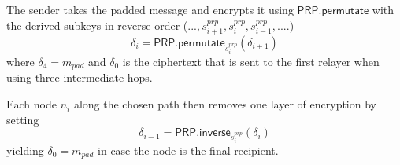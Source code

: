 The sender takes the padded message and encrypts it using $\mathsf{PRP.permutate}$ with the derived subkeys in reverse order ($...,s_{i+1}^{prp}, s_i^{prp}, s_{i-1}^{prp},....$) $$\delta_i = \mathsf{PRP.permutate}_{s_i^{prp}}(\delta_{i+1})$$ where $\delta_4 = m_{pad}$ and $\delta_0$ is the ciphertext that is sent to the first relayer when using three intermediate hops.

Each node $n_i$ along the chosen path then removes one layer of encryption by setting $$\delta_{i-1} = \mathsf{PRP.inverse}_{s_i^{prp}}(\delta_i)$$ yielding $\delta_0 = m_{pad}$ in case the node is the final recipient.

